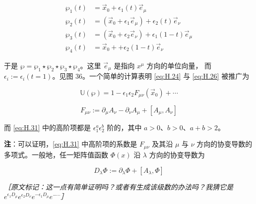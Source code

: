 \begin{equation}
  \begin{aligned}
    \wp_1(t) &= \vec{x}_0 + \epsilon_1(t)\vec{e}_\mu \\
    \wp_2(t) &= (\vec{x}_0 + \epsilon_1\vec{e}_\mu) + \epsilon_2(t)\vec{e}_\nu \\
    \wp_3(t) &= (\vec{x}_0 + \epsilon_2\vec{e}_\nu) + \epsilon_1(1-t)\vec{e}_\mu \\
    \wp_4(t) &= \vec{x}_0 + +\epsilon_2(1-t)\vec{e}_\nu
  \end{aligned}
  \tag{H.30}
  \label{eq:H.30}
\end{equation}


于是 $\wp=\wp_1\star\wp_2\star\wp_3\star\wp_4$。这里 $\vec{e}_\mu$ 是指向 $x^\mu$ 方向的单位向量，
而 $\epsilon_i:=\epsilon_i(t=1)$。见图 36。一个简单的计算表明 \eqref{eq:H.24} 与 \eqref{eq:H.26} 被推广为

\begin{equation}
  \mathbb{U}(\wp) = 1 - \epsilon_1\epsilon_2 F_{\mu\nu}(\vec{x}_0) + \cdots
  \tag{H.31}
  \label{eq:H.31}
\end{equation}

\begin{equation}
  F_{\mu\nu} := \partial_\mu A_\nu - \partial_\nu A_\mu + [A_\mu,A_\nu]
  \tag{H.32}
  \label{eq:H.32}
\end{equation}

而 \eqref{eq:H.31} 中的高阶项都是 $\epsilon_1^a\epsilon_2^b$ 阶的，其中 $a>0$、$b>0$、$a+b>2$。

\textbf{注}：可以证明，\eqref{eq:H.31} 中高阶项的系数是 $F_{\mu\nu}$ 及其沿 $\mu$ 与 $\nu$ 方向的协变导数的
多项式。一般地，任一矩阵值函数 $\Phi(x)$ 沿 $\lambda$ 方向的协变导数为

\begin{equation}
  D_\lambda\Phi := \partial_\lambda\Phi + [A_\lambda,\Phi]
  \tag{H.33}
  \label{eq:H.33}
\end{equation}

{\small\itshape ［原文标记：这一点有简单证明吗？或者有生成该级数的办法吗？我猜它是
$e^{\epsilon_1 D_\mu}e^{\epsilon_2 D_\nu}e^{-\epsilon_1 D_\mu}e^{-\cdots}$］}


